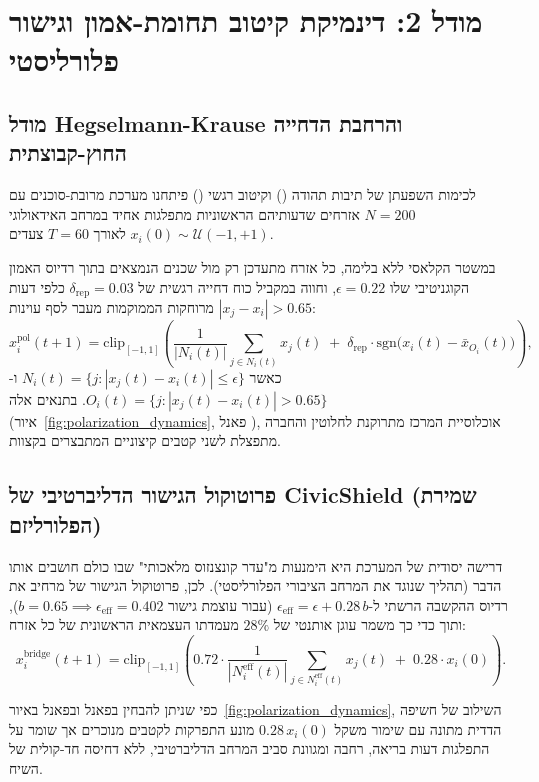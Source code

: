 \section{מודל 2: דינמיקת קיטוב תחומת-אמון וגישור פלורליסטי}
\subsection{מודל Hegselmann-Krause והרחבת הדחייה החוץ-קבוצתית}
לכימות השפעתן של תיבות תהודה () וקיטוב רגשי () פיתחנו מערכת מרובת-סוכנים עם $N = 200$ אזרחים שדעותיהם הראשוניות מתפלגות אחיד במרחב האידאולוגי $x_i(0) \sim \mathcal{U}(-1, +1)$ לאורך $T = 60$ צעדים.

במשטר הקלאסי ללא בלימה, כל אזרח מתעדכן רק מול שכנים הנמצאים בתוך רדיוס האמון הקוגניטיבי שלו $\epsilon = 0.22$, וחווה במקביל כוח דחייה רגשית של $\delta_{\text{rep}} = 0.03$ כלפי דעות מרוחקות הממוקמות מעבר לסף עוינות $|x_j - x_i| > 0.65$:
\begin{equation}
    x_i^{\text{pol}}(t+1) = \text{clip}_{[-1,1]}\!\left( \frac{1}{|N_i(t)|}\sum_{j \in N_i(t)} x_j(t) \;+\; \delta_{\text{rep}} \cdot \text{sgn}\!\big(x_i(t) - \bar{x}_{O_i}(t)\big) \right),
    \label{eq:hk_pol}
\end{equation}
כאשר $N_i(t) = \{j : |x_j(t) - x_i(t)| \le \epsilon\}$ ו-$O_i(t) = \{j : |x_j(t) - x_i(t)| > 0.65\}$. בתנאים אלה (איור~\ref{fig:polarization_dynamics}, פאנל ), אוכלוסיית המרכז מתרוקנת לחלוטין והחברה מתפצלת לשני קטבים קיצוניים המתבצרים בקצוות.

\subsection{פרוטוקול הגישור הדליברטיבי של CivicShield (שמירת הפלורליזם)}
דרישה יסודית של המערכת היא הימנעות מ"עדר קונצנזוס מלאכותי" שבו כולם חושבים אותו הדבר (תהליך שנוגד את המרחב הציבורי הפלורליסטי). לכן, פרוטוקול הגישור של  מרחיב את רדיוס ההקשבה הרשתי ל-$\epsilon_{\text{eff}} = \epsilon + 0.28\,b$ (עבור עוצמת גישור $b = 0.65 \implies \epsilon_{\text{eff}} = 0.402$), ותוך כדי כך משמר עוגן אותנטי של $28\%$ מעמדתו העצמאית הראשונית של כל אזרח:
\begin{equation}
    x_i^{\text{bridge}}(t+1) = \text{clip}_{[-1,1]}\!\left( 0.72 \cdot \frac{1}{|N_i^{\text{eff}}(t)|}\sum_{j \in N_i^{\text{eff}}(t)} x_j(t) \;+\; 0.28 \cdot x_i(0) \right).
    \label{eq:hk_bridge}
\end{equation}

כפי שניתן להבחין בפאנל  ובפאנל  באיור~\ref{fig:polarization_dynamics}, השילוב של חשיפה הדדית מתונה עם שימור משקל $0.28\,x_i(0)$ מונע התפרקות לקטבים מנוכרים אך שומר על התפלגות דעות בריאה, רחבה ומגוונת סביב המרחב הדליברטיבי, ללא דחיסה חד-קולית של השיח.

